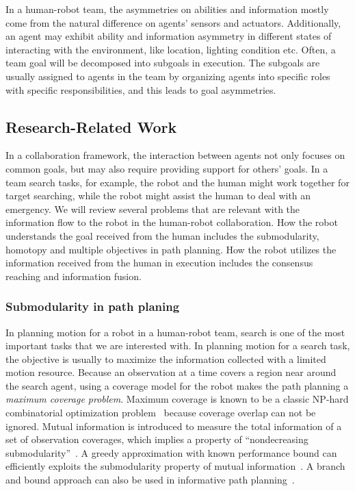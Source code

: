 \documentclass[phd]{byuprop}
\begin{document}
In a human-robot team, the asymmetries on abilities and information mostly come from the natural difference on agents’ sensors and actuators. 
Additionally, an agent may exhibit ability and information asymmetry in different states of interacting with the environment, like location, lighting condition etc. 
Often, a team goal will be decomposed into subgoals in execution. 
The subgoals are usually assigned to agents in the team by organizing agents into specific roles with specific responsibilities, and this leads to goal asymmetries.

\subsection{Research-Related Work}

In a collaboration framework, the interaction between agents not only focuses on common goals, but may also require providing support for others’ goals. 
In a team search tasks, for example, the robot and the human might work together for target searching, while the robot might assist the human to deal with an emergency.
We will review several problems that are relevant with the information flow to the robot in the human-robot collaboration.
How the robot understands the goal received from the human includes the submodularity, homotopy and multiple objectives in path planning.
How the robot utilizes the information received from the human in execution includes the consensus reaching and information fusion.

\subsubsection{Submodularity in path planing}

In planning motion for a robot in a human-robot team, search is one of the most important tasks that we are interested with.
In planning motion for a search task, the objective is usually to maximize the information collected with a limited motion resource.
Because an observation at a time covers a region near around the search agent, using a coverage model for the robot makes the path planning a {\em maximum coverage problem}.
Maximum coverage is known to be a classic NP-hard combinatorial optimization problem~\cite{Megiddo1983} because coverage overlap can not be ignored. 
Mutual information is introduced to measure the total information
of a set of observation coverages, which implies a property of
“nondecreasing submodularity”~\cite{Singh2009}. 
A greedy approximation with known performance bound can efficiently exploits the submodularity property of mutual information~\cite{Singh2009}. 
A branch and bound approach can also be used in informative path
planning~\cite{Binney2012}.
\end{document}
